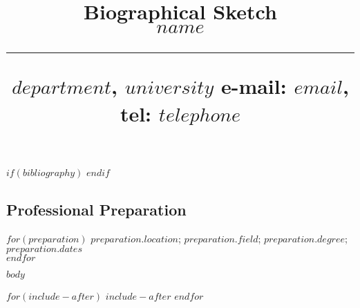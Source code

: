 \documentclass[svgnames,11pt]{article}
\title{%
        \vspace{-2\baselineskip}
            \normalsize
            Biographical Sketch\\
            {\large\textbf{$name$}}\\
            \vspace{0.5\baselineskip}
            \hrule
            \vspace{0.5\baselineskip}
            $department$, $university$
            e-mail: \href{mailto:$email$}{$email$},
            tel: $telephone$
        \vspace{-1.5ex}
        }
\begin{document}
$if(bibliography)$
$endif$


\maketitle
\vspace{-4\baselineskip}


\subsection{Professional Preparation}

  $for(preparation)$
      $preparation.location$; $preparation.field$; $preparation.degree$; $preparation.dates$ \\
  $endfor$



$body$



$for(include-after)$
  $include-after$
$endfor$
\end{document}
